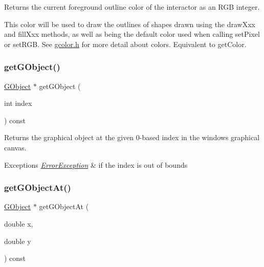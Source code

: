 Returns the current foreground outline color of the interactor as an R\+GB integer. 

This color will be used to draw the outlines of shapes drawn using the draw\+Xxx and fill\+Xxx methods, as well as being the default color used when calling set\+Pixel or set\+R\+GB. See \mbox{\hyperlink{gcolor_8h_source}{gcolor.\+h}} for more detail about colors. Equivalent to get\+Color. \mbox{\label{classGWindow_adf27adaeeb8b551424b2096a20285fde}} 
\subsubsection{\texorpdfstring{get\+G\+Object()}{getGObject()}}
{\footnotesize\ttfamily \mbox{\hyperlink{classGObject}{G\+Object}} $\ast$ get\+G\+Object (\begin{DoxyParamCaption}\item[{int}]{index }\end{DoxyParamCaption}) const\hspace{0.3cm}{\ttfamily [virtual]}}



Returns the graphical object at the given 0-\/based index in the window\textquotesingle{}s graphical canvas. 


\begin{DoxyExceptions}{Exceptions}
{\em \mbox{\hyperlink{classErrorException}{Error\+Exception}}} & if the index is out of bounds \\
\hline
\end{DoxyExceptions}
\mbox{\label{classGWindow_ab174a229ac7a3e9a4cd135d68dcf0076}} 
\subsubsection{\texorpdfstring{get\+G\+Object\+At()}{getGObjectAt()}}
{\footnotesize\ttfamily \mbox{\hyperlink{classGObject}{G\+Object}} $\ast$ get\+G\+Object\+At (\begin{DoxyParamCaption}\item[{double}]{x,  }\item[{double}]{y }\end{DoxyParamCaption}) const\hspace{0.3cm}{\ttfamily [virtual]}}



